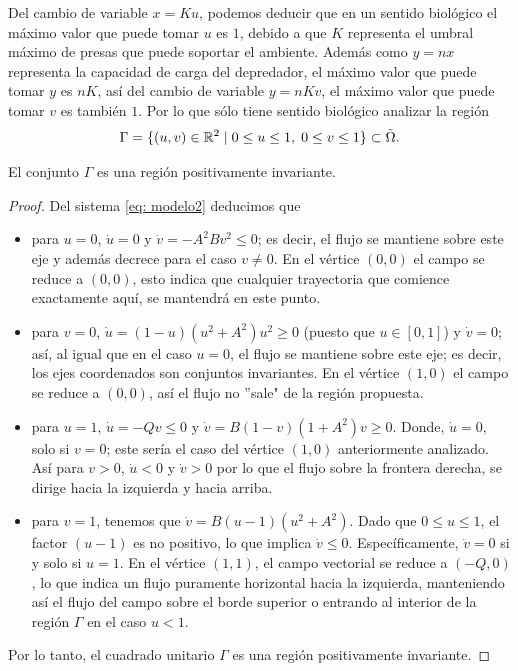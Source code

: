 Del cambio de variable $x = Ku$, podemos deducir que en un sentido biológico el máximo valor que puede tomar $u$ es $1$, debido a que $K$ representa el umbral máximo de presas que puede soportar el ambiente. Además como $y = nx$ representa la capacidad de carga del depredador, el máximo valor que puede tomar $y$ es $nK$, así del cambio de variable $y = n K v$, el máximo valor que puede tomar $v$ es también $1$. Por lo que sólo tiene sentido biológico analizar la región $$\Gamma = \{ (u, v) \in {\mathbb{R}}^{2} \; | \; 0 \leq u \leq 1, \; 0 \leq v \leq 1 \} \subset \tilde{\Omega}.$$
\begin{lem}
	El conjunto $\Gamma$ es una región positivamente invariante.
\end{lem}
\begin{proof}
	Del sistema \eqref{eq: modelo2} deducimos que 
	
	\begin{itemize}
		\item para $u = 0$, $\dot{u} = 0$ y $\dot{v} = -A^2Bv^2 \leq 0$; es decir, el flujo se mantiene sobre este eje y además decrece para el caso $v\neq0$. En el vértice $(0, 0)$ el campo se reduce a $(0,0)$, esto indica que cualquier trayectoria que comience exactamente aquí, se mantendrá en este punto.
		
		\item para $v = 0$, $\dot{u} = (1 - u)(u^{2} + A^{2})u^{2} \geq 0$ (puesto que $u \in [0, 1]$) y $\dot{v} = 0$; así, al igual que en el caso $u=0$, el flujo se mantiene sobre este eje; es decir, los ejes coordenados son conjuntos invariantes. En el vértice $(1, 0)$ el campo se reduce a $(0,0)$, así el flujo no ''sale" de la región propuesta.
		
		\item para $u=1$, $\dot{u} = -Qv \leq 0$ y $\dot{v} = B(1 - v)(1 + A^{2})v \geq 0$. Donde, $\dot{u} = 0$, solo si $v=0$; este sería el caso del vértice $(1,0)$ anteriormente analizado. Así para $v>0$, $\dot{u} < 0$ y $\dot{v} > 0$ por lo que el flujo sobre la frontera derecha, se dirige hacia la izquierda y hacia arriba. 
		
		\item para $v=1$, tenemos que $\dot{v}=B(u-1)(u^2+A^2)$. Dado que $0\leq u \leq1$, el factor $(u-1)$ es no positivo, lo que implica $\dot{v} \leq0$. Específicamente, $\dot{v} =0$ si y solo si $u=1$. En el vértice $(1,1)$, el campo vectorial se reduce a $(-Q,0)$, lo que indica un flujo puramente horizontal hacia la izquierda, manteniendo así el flujo del campo sobre el borde superior o entrando al interior de la región $\Gamma$ en el caso $u<1$.
	\end{itemize}
	
	\noindent Por lo tanto, el cuadrado unitario $\Gamma$ es una región positivamente invariante.
\end{proof}
